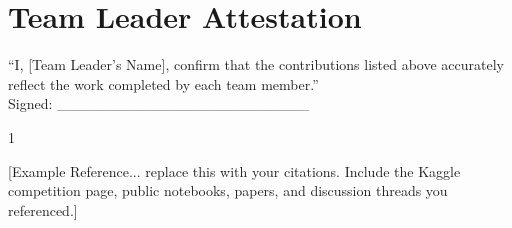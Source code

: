 \documentclass[journal]{IEEEtran}
\begin{document}
\section*{Team Leader Attestation}
``I, [Team Leader's Name], confirm that the contributions listed above accurately reflect the work completed by each team member.'' \\
\vspace{0.5cm}
Signed: \_\_\_\_\_\_\_\_\_\_\_\_\_\_\_\_\_\_\_\_\_\_\_\_

\begin{thebibliography}{1}


[Example Reference... replace this with your citations. Include the Kaggle competition page, public notebooks, papers, and discussion threads you referenced.]

\end{thebibliography}
\end{document}
